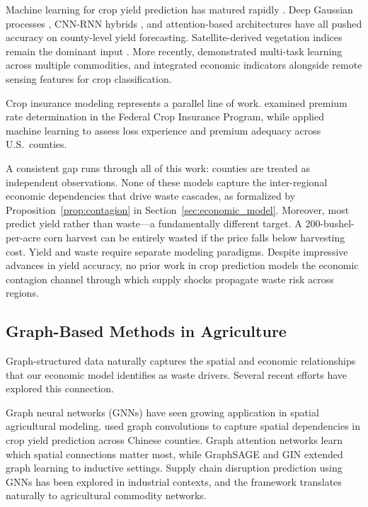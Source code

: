 \documentclass[preprint,12pt,authoryear]{elsarticle}
\begin{document}
Machine learning for crop yield prediction has matured rapidly \citep{vanklompenburg2020crop}. Deep Gaussian processes \citep{you2017deep}, CNN-RNN hybrids \citep{khaki2020cnn}, and attention-based architectures \citep{wang2020winter} have all pushed accuracy on county-level yield forecasting. Satellite-derived vegetation indices remain the dominant input \citep{huete2002overview,wolanin2020estimating}. More recently, \citet{peng2025multitask} demonstrated multi-task learning across multiple commodities, and \citet{ding2022integrating} integrated economic indicators alongside remote sensing features for crop classification.

Crop insurance modeling represents a parallel line of work. \citet{goodwin2004premium} examined premium rate determination in the Federal Crop Insurance Program, while \citet{yu2018assessing} applied machine learning to assess loss experience and premium adequacy across U.S.\ counties.

A consistent gap runs through all of this work: counties are treated as independent observations. None of these models capture the inter-regional economic dependencies that drive waste cascades, as formalized by Proposition~\ref{prop:contagion} in Section~\ref{sec:economic_model}. Moreover, most predict yield rather than waste---a fundamentally different target. A 200-bushel-per-acre corn harvest can be entirely wasted if the price falls below harvesting cost. Yield and waste require separate modeling paradigms. Despite impressive advances in yield accuracy, no prior work in crop prediction models the economic contagion channel through which supply shocks propagate waste risk across regions.

\subsection{Graph-Based Methods in Agriculture}

Graph-structured data naturally captures the spatial and economic relationships that our economic model identifies as waste drivers. Several recent efforts have explored this connection.

Graph neural networks (GNNs) have seen growing application in spatial agricultural modeling. \citet{fan2022gnn_crop} used graph convolutions \citep{kipf2017gcn} to capture spatial dependencies in crop yield prediction across Chinese counties. Graph attention networks \citep{velickovic2018gat} learn which spatial connections matter most, while GraphSAGE \citep{hamilton2017graphsage} and GIN \citep{xu2019powerful} extended graph learning to inductive settings. Supply chain disruption prediction using GNNs \citep{kosasih2022graph,brintrup2020supply} has been explored in industrial contexts, and the framework translates naturally to agricultural commodity networks.
\end{document}
